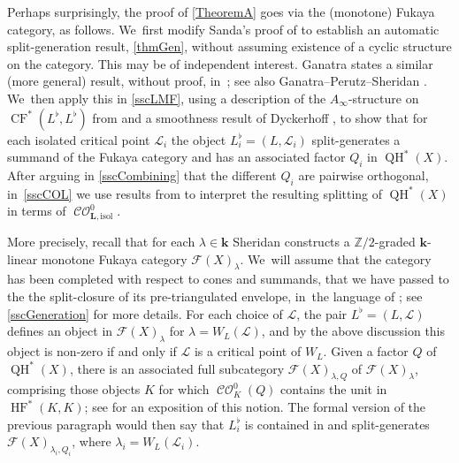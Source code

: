 \documentclass[JEP,XML,SOM,Unicode,NoEqCountersInSection,NoFloatCountersInSection,published]{cedram}
\theoremstyle{definition}
\newcommand{\ZZ}{\mathbb{Z}}
\newcommand{\LL}{L^\flat}
\newcommand{\calL}{\mathcal{L}}
\newcommand{\Fuk}{\mathcal{F}}
\newcommand{\kk}{{\boldsymbol{k}}}
\newcommand{\bL}{{\boldsymbol{L}}}
\newcommand{\isol}{\mathrm{isol}}
\newcommand{\HF}{\operatorname{HF}}
\newcommand{\CF}{\operatorname{CF}}
\newcommand{\CO}{\operatorname{\mathcal{CO}}}
\newcommand{\QH}{\operatorname{QH}}
\begin{document}
Perhaps surprisingly, the proof of \cref{TheoremA} goes via the (monotone) Fukaya category, as follows. We~first modify Sanda's proof of \cite[Th.\,1.1]{Sanda} to establish an automatic split-generation result, \cref{thmGen}, without assuming existence of a cyclic structure on the category. This may be of independent interest. Ganatra states a similar (more general) result, without proof, in~\cite[Rem.\,35]{GanatraAutomaticGeneration}; see also Ganatra--Perutz--Sheridan \cite[Th.\,5.2]{GanatraPerutzSheridan}. We~then apply this in \cref{sscLMF}, using a description of the $A_\infty$-structure on $\CF^*(\LL, \LL)$ from \cite{SmithSuperfiltered} and a smoothness result of Dyckerhoff \cite[\S 7]{Dyckerhoff}, to show that for each isolated critical point $\calL_i$ the object $\LL_i = (L, \calL_i)$ split-generates a summand of the Fukaya category and has an associated factor $Q_i$ in $\QH^*(X)$. After arguing in \cref{sscCombining} that the different $Q_i$ are pairwise orthogonal, in~\cref{sscCOL} we use results from \cite{SmithHHviaHF} to interpret the resulting splitting of $\QH^*(X)$ in terms of $\CO^0_{\bL, \isol}$.

More precisely, recall that for each $\lambda \in \kk$ Sheridan \cite{SheridanFano} constructs a $\ZZ/2$-graded $\kk$\nobreakdash-linear monotone Fukaya category $\Fuk(X)_\lambda$. We~will assume that the category has been completed with respect to cones and summands, \ie that we have passed to the the split-closure of its pre-triangulated envelope, in~the language of \cite{SeidelBook}; see \cref{sscGeneration} for more details. For each choice of $\calL$, the pair $\LL = (L, \calL)$ defines an object in $\Fuk(X)_\lambda$ for $\lambda = W_L(\calL)$, and by the above discussion this object is non-zero if and only if $\calL$ is a critical point of $W_L$. Given a factor $Q$ of $\QH^*(X)$, there is an associated full subcategory $\Fuk(X)_{\lambda, Q}$ of $\Fuk(X)_\lambda$, comprising those objects $K$ for which $\CO^0_K(Q)$ contains the unit in $\HF^*(K, K)$; see \cite[App.\,A]{SmithHHviaHF} for an exposition of this notion. The formal version of the previous paragraph would then say that $\LL_i$ is contained in and split-generates $\Fuk(X)_{\lambda_i, Q_i}$, where $\lambda_i = W_L(\calL_i)$.
\end{document}
